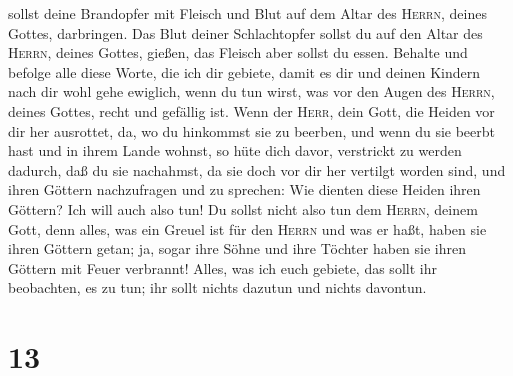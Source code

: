sollst deine Brandopfer mit Fleisch und Blut auf dem Altar des
\textsc{Herrn}, deines Gottes, darbringen. Das Blut deiner Schlachtopfer
sollst du auf den Altar des \textsc{Herrn}, deines Gottes, gießen, das
Fleisch aber sollst du essen.  Behalte und befolge alle
diese Worte, die ich dir gebiete, damit es dir und deinen Kindern nach
dir wohl gehe ewiglich, wenn du tun wirst, was vor den Augen des
\textsc{Herrn}, deines Gottes, recht und gefällig ist. 
Wenn der \textsc{Herr}, dein Gott, die Heiden vor dir her ausrottet, da,
wo du hinkommst sie zu beerben, und wenn du sie beerbt hast und in ihrem
Lande wohnst,  so hüte dich davor, verstrickt zu werden
dadurch, daß du sie nachahmst, da sie doch vor dir her vertilgt worden
sind, und ihren Göttern nachzufragen und zu sprechen: Wie dienten diese
Heiden ihren Göttern? Ich will auch also tun!  Du sollst
nicht also tun dem \textsc{Herrn}, deinem Gott, denn alles, was ein
Greuel ist für den \textsc{Herrn} und was er haßt, haben sie ihren
Göttern getan; ja, sogar ihre Söhne und ihre Töchter haben sie ihren
Göttern mit Feuer verbrannt!  Alles, was ich euch
gebiete, das sollt ihr beobachten, es zu tun; ihr sollt nichts dazutun
und nichts davontun.

\hypertarget{section-12}{%
\section{13}\label{section-12}}

